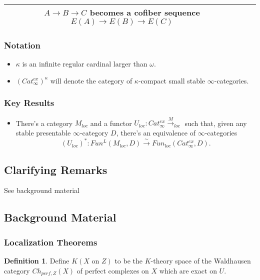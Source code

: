 \documentclass[letterpaper]{article}
\theoremstyle{definition}
\newtheorem{definition}[lemma]{Definition}
\begin{document}
\begin{tabulary}{0.9\textwidth}{|C|C|C|}
                                                                $A
                                                                \rightarrow
                                                                B
                                                                \rightarrow
                                                                C$
                                                                becomes
                                                                a
                                                                cofiber
                                                                sequence
                                                                $E(A) \rightarrow E(B) \rightarrow E(C)$\\
\hline
\end{tabulary}
\subsubsection{Notation}
\begin{itemize}
\item $\kappa$ is an infinite regular cardinal larger than $\omega$.
\item $(Cat_\infty^{ex})^\kappa$ will denote the category of
  $\kappa$-compact small stable $\infty$-categories.
\end{itemize}
\subsubsection{Key Results}
\begin{itemize}
\item There's a category $M_{loc}$ and a functor $U_{loc} :
  Cat_\infty^{ex} \xrightarrow M_{loc}$ such that, given any stable
  presentable $\infty$-category $D$, there's an equivalence of
  $\infty$-categories
\[
(U_{loc})^* : Fun^L(M_{loc},D) \xrightarrow{\sim} Fun_{loc}(Cat_{\infty}^{ex},D).
\]
\end{itemize}
\subsection{Clarifying Remarks}
See background material
\subsection{Background Material}

\subsubsection{Localization Theorems}
\begin{definition}
Define $K(X \text{ on } Z)$ to be the $K$-theory space of the
Waldhausen category $Ch_{perf,Z}(X)$ of perfect complexes on $X$ which
are exact on $U$. 
\end{definition}
\end{document}
